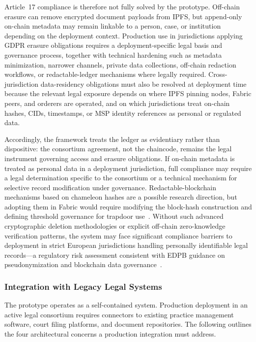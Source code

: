 \documentclass{ieeeaccess}
\begin{document}
Article~17 compliance is therefore not fully solved by the prototype.
Off-chain erasure can remove encrypted document payloads from IPFS,
but append-only on-chain metadata may remain linkable to a person,
case, or institution depending on the deployment context. Production
use in jurisdictions applying GDPR erasure obligations requires a
deployment-specific legal basis and governance process, together with
technical hardening such as metadata minimization, narrower channels,
private data collections, off-chain redaction workflows, or
redactable-ledger mechanisms where legally required. Cross-jurisdiction data-residency obligations must also be resolved at
deployment time because the relevant legal exposure depends on where IPFS
pinning nodes, Fabric peers, and orderers are operated, and on which
jurisdictions treat on-chain hashes, CIDs, timestamps, or MSP identity
references as personal or regulated data.

Accordingly, the framework treats the ledger as evidentiary rather than dispositive: the consortium agreement, not the chaincode, remains the legal instrument governing access and erasure obligations. If on-chain metadata is treated as personal data in a deployment jurisdiction, full compliance may require a legal determination specific to the consortium or a technical mechanism for selective
record modification under governance. Redactable-blockchain mechanisms based on chameleon hashes are a possible research direction, but adopting them in Fabric would require modifying the block-hash construction and defining threshold governance for trapdoor use~\cite{ateniese2017redactable,lyons2018integration}. Without such advanced cryptographic deletion methodologies or explicit off-chain zero-knowledge verification patterns, the system may face significant compliance barriers to deployment in strict European jurisdictions handling personally identifiable legal records---a regulatory risk assessment consistent with EDPB guidance on pseudonymization and blockchain data governance~\cite{EDPB2025Pseudonymisation,Finck2020}.

\subsubsection{Integration with Legacy Legal Systems}
The prototype operates as a self-contained system. Production
deployment in an active legal consortium requires connectors to
existing practice management software, court filing platforms, and
document repositories. The following outlines the four architectural
concerns a production integration must address.
\end{document}
